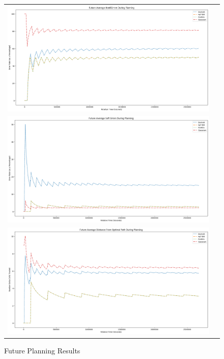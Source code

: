 \begin{figure}
  \begin{tabular}{cc}
    {\includegraphics[width = 5in]{images/results/Future_Average_Hard_Errors_During_Planning.png}} \\
    {\includegraphics[width = 5in]{images/results/Future_Average_Soft_Errors_During_Planning.png}} \\
    {\includegraphics[width = 5in]{images/results/Future_Average_Distance_From_Optimal_Path_During_Planning.png}} \\
  \end{tabular}
  \caption{ Future Planning Results}
  \label{fig:G_FP_res}
\end{figure}







